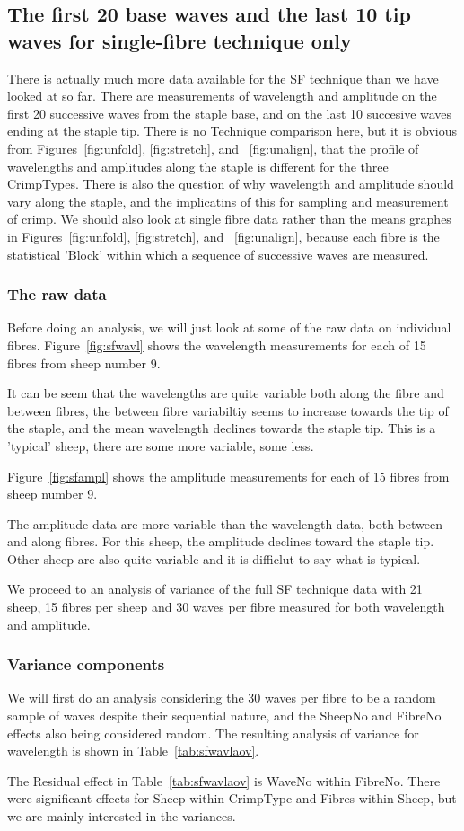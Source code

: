\documentclass[titlepage,10pt]{article}  %
\begin{document}
\subsection{The first 20 base waves and the last 10 tip waves for single-fibre technique only}
\label{sf2010}
There is actually much more data available for the SF technique than we have looked at so far. There are measurements of wavelength and amplitude on the first 20 successive waves from the staple base, and on the last 10 succesive waves ending at the staple tip. There is no Technique comparison here, but it is obvious from Figures~\ref{fig:unfold}, \ref{fig:stretch}, and ~\ref{fig:unalign}, that the profile of wavelengths and amplitudes along the staple is different for the three CrimpTypes. There is also the question of why wavelength and amplitude should vary along the staple, and the implicatins of this for sampling and measurement of crimp. We should also look at single fibre data rather than the means graphes in Figures~\ref{fig:unfold}, \ref{fig:stretch}, and ~\ref{fig:unalign}, because each fibre is the statistical 'Block' within which a sequence of successive waves are measured.

\subsubsection{The raw data}
Before doing an analysis, we will just look at some of the raw data on individual fibres. Figure~\ref{fig:sfwavl} shows the wavelength measurements for each of 15 fibres from sheep number 9. 

It can be seem that the wavelengths are quite variable both along the fibre and between fibres, the between fibre variabiltiy seems to increase towards the tip of the staple, and the mean wavelength declines towards the staple tip. This is a 'typical' sheep, there are some more variable, some less.

Figure~\ref{fig:sfampl} shows the amplitude measurements for each of 15 fibres from sheep number 9.

The amplitude data are more variable than the wavelength data, both between and along fibres. For this sheep, the amplitude declines toward the staple tip. Other sheep are also quite variable and it is difficlut to say what is typical.

We proceed to an analysis of variance of the full SF technique data with 21 sheep, 15 fibres per sheep and 30 waves per fibre measured for both wavelength and amplitude.

\subsubsection{Variance components}
We will first do an analysis considering  the 30 waves per fibre  to be a random sample of waves despite their sequential nature, and the SheepNo and FibreNo effects also being considered random. The resulting  analysis of variance for wavelength is shown in Table~\ref{tab:sfwavlaov}.

The Residual effect in Table~\ref{tab:sfwavlaov} is WaveNo within FibreNo.
There were significant effects for  Sheep within CrimpType  and Fibres within Sheep, but we are mainly interested in the variances.  
\end{document}
